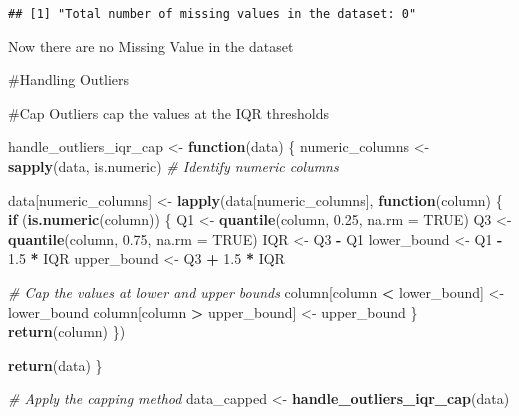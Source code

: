\documentclass[
]{article}
\newenvironment{Shaded}{\begin{snugshade}}{\end{snugshade}}
\newcommand{\AttributeTok}[1]{\textcolor[rgb]{0.13,0.29,0.53}{#1}}
\newcommand{\CommentTok}[1]{\textcolor[rgb]{0.56,0.35,0.01}{\textit{#1}}}
\newcommand{\ConstantTok}[1]{\textcolor[rgb]{0.56,0.35,0.01}{#1}}
\newcommand{\ControlFlowTok}[1]{\textcolor[rgb]{0.13,0.29,0.53}{\textbf{#1}}}
\newcommand{\FloatTok}[1]{\textcolor[rgb]{0.00,0.00,0.81}{#1}}
\newcommand{\FunctionTok}[1]{\textcolor[rgb]{0.13,0.29,0.53}{\textbf{#1}}}
\newcommand{\NormalTok}[1]{#1}
\newcommand{\OtherTok}[1]{\textcolor[rgb]{0.56,0.35,0.01}{#1}}
\newcommand{\SpecialCharTok}[1]{\textcolor[rgb]{0.81,0.36,0.00}{\textbf{#1}}}
\begin{document}
\begin{verbatim}
## [1] "Total number of missing values in the dataset: 0"
\end{verbatim}

Now there are no Missing Value in the dataset

\#Handling Outliers

\#Cap Outliers cap the values at the IQR thresholds

\begin{Shaded}
\begin{Highlighting}[]
\NormalTok{handle\_outliers\_iqr\_cap }\OtherTok{\textless{}{-}} \ControlFlowTok{function}\NormalTok{(data) \{}
\NormalTok{  numeric\_columns }\OtherTok{\textless{}{-}} \FunctionTok{sapply}\NormalTok{(data, is.numeric)  }\CommentTok{\# Identify numeric columns}
  
\NormalTok{  data[numeric\_columns] }\OtherTok{\textless{}{-}} \FunctionTok{lapply}\NormalTok{(data[numeric\_columns], }\ControlFlowTok{function}\NormalTok{(column) \{}
    \ControlFlowTok{if}\NormalTok{ (}\FunctionTok{is.numeric}\NormalTok{(column)) \{}
\NormalTok{      Q1 }\OtherTok{\textless{}{-}} \FunctionTok{quantile}\NormalTok{(column, }\FloatTok{0.25}\NormalTok{, }\AttributeTok{na.rm =} \ConstantTok{TRUE}\NormalTok{)}
\NormalTok{      Q3 }\OtherTok{\textless{}{-}} \FunctionTok{quantile}\NormalTok{(column, }\FloatTok{0.75}\NormalTok{, }\AttributeTok{na.rm =} \ConstantTok{TRUE}\NormalTok{)}
\NormalTok{      IQR }\OtherTok{\textless{}{-}}\NormalTok{ Q3 }\SpecialCharTok{{-}}\NormalTok{ Q1}
\NormalTok{      lower\_bound }\OtherTok{\textless{}{-}}\NormalTok{ Q1 }\SpecialCharTok{{-}} \FloatTok{1.5} \SpecialCharTok{*}\NormalTok{ IQR}
\NormalTok{      upper\_bound }\OtherTok{\textless{}{-}}\NormalTok{ Q3 }\SpecialCharTok{+} \FloatTok{1.5} \SpecialCharTok{*}\NormalTok{ IQR}
      
      \CommentTok{\# Cap the values at lower and upper bounds}
\NormalTok{      column[column }\SpecialCharTok{\textless{}}\NormalTok{ lower\_bound] }\OtherTok{\textless{}{-}}\NormalTok{ lower\_bound}
\NormalTok{      column[column }\SpecialCharTok{\textgreater{}}\NormalTok{ upper\_bound] }\OtherTok{\textless{}{-}}\NormalTok{ upper\_bound}
\NormalTok{    \}}
    \FunctionTok{return}\NormalTok{(column)}
\NormalTok{  \})}
  
  \FunctionTok{return}\NormalTok{(data)}
\NormalTok{\}}

\CommentTok{\# Apply the capping method}
\NormalTok{data\_capped }\OtherTok{\textless{}{-}} \FunctionTok{handle\_outliers\_iqr\_cap}\NormalTok{(data)}


\end{Highlighting}
\end{Shaded}
\end{document}
